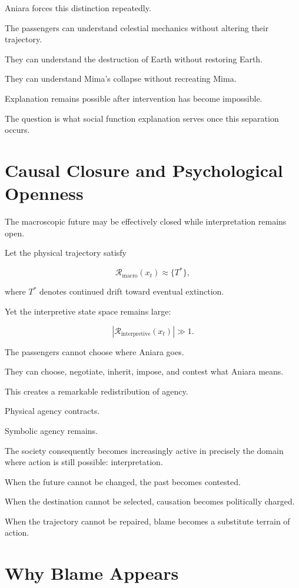 \documentclass[11pt,oneside]{book}
\theoremstyle{definition}
\theoremstyle{remark}
\newcommand{\R}{\mathcal{R}}
\begin{document}
Aniara forces this distinction repeatedly.

The passengers can understand celestial mechanics without altering their trajectory.

They can understand the destruction of Earth without restoring Earth.

They can understand Mima's collapse without recreating Mima.

Explanation remains possible after intervention has become impossible.

The question is what social function explanation serves once this separation occurs.

\section{Causal Closure and Psychological Openness}

The macroscopic future may be effectively closed while interpretation remains open.

Let the physical trajectory satisfy

\[
\R_{\mathrm{macro}}(x_t)
\approx
\{T^\ast\},
\]

where \(T^\ast\) denotes continued drift toward eventual extinction.

Yet the interpretive state space remains large:

\[
|\R_{\mathrm{interpretive}}(x_t)|\gg1.
\]

The passengers cannot choose where Aniara goes.

They can choose, negotiate, inherit, impose, and contest what Aniara means.

This creates a remarkable redistribution of agency.

Physical agency contracts.

Symbolic agency remains.

The society consequently becomes increasingly active in precisely the domain where action is still possible: interpretation.

When the future cannot be changed, the past becomes contested.

When the destination cannot be selected, causation becomes politically charged.

When the trajectory cannot be repaired, blame becomes a substitute terrain of action.

\section{Why Blame Appears}
\end{document}
